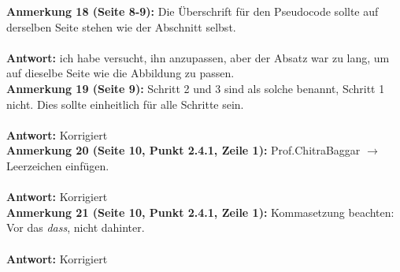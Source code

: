 \documentclass[a4paper,12pt]{book}
\begin{document}
\noindent
\textbf{Anmerkung 18 (Seite 8-9):}
Die Überschrift für den Pseudocode sollte auf derselben Seite stehen wie der Abschnitt selbst. \\ \\
\textbf{Antwort:} ich habe versucht, ihn anzupassen, aber der Absatz war zu lang, um auf dieselbe Seite wie die Abbildung zu passen.
\\

\noindent
\textbf{Anmerkung 19 (Seite 9):}
Schritt 2 und 3 sind als solche benannt, Schritt 1 nicht. Dies sollte einheitlich für alle Schritte sein. 
\\ \\
\textbf{Antwort:} Korrigiert
\\

\noindent
\textbf{Anmerkung 20 (Seite 10, Punkt 2.4.1, Zeile 1):}
Prof.ChitraBaggar $\rightarrow$ Leerzeichen einfügen. 
\\ \\
\textbf{Antwort:} Korrigiert
\\

\noindent
\textbf{Anmerkung 21 (Seite 10, Punkt 2.4.1, Zeile 1):}
Kommasetzung beachten: Vor das \emph{dass}, nicht dahinter. 
\\ \\
\textbf{Antwort:} Korrigiert
\\
\end{document}
